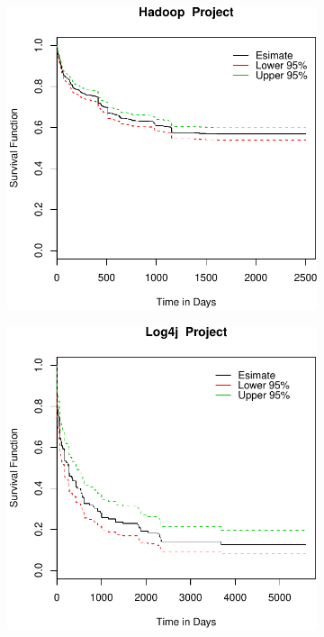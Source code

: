 \begin{figure}[t]
\begin{subfigure}[b]{0.195\textwidth}
	\end{subfigure}
	\begin{subfigure}[b]{0.195\textwidth}
		\includegraphics[width=\textwidth]{figures/Survival/hadoop.pdf}
	\end{subfigure}
	\begin{subfigure}[b]{0.195\textwidth}
		\includegraphics[width=\textwidth]{figures/Survival/log4j.pdf}

\end{subfigure}
\end{figure}
